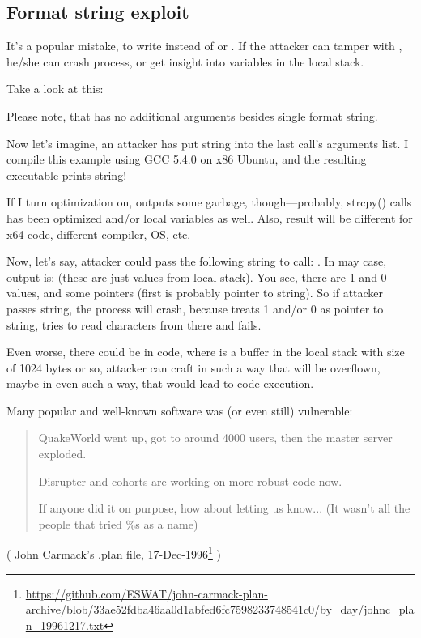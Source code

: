 \subsection{Format string exploit}

It's a popular mistake, to write  instead of  or .
If the attacker can tamper with , he/she can crash process, or get insight into variables in the local stack.

Take a look at this:



Please note, that \printf has no additional arguments besides single format string.

Now let's imagine, an attacker has put  string into the last \printf call's arguments list.
I compile this example using GCC 5.4.0 on x86 Ubuntu, and the resulting executable prints  string!

If I turn optimization on, \printf outputs some garbage, though---probably, strcpy() calls has been optimized and/or
local variables as well.
Also, result will be different for x64 code, different compiler, \ac{OS}, etc.

Now, let's say, attacker could pass the following string to \printf call: .
In may case, output is:  (these are just values from local stack).
You see, there are 1 and 0 values, and some pointers (first is probably pointer to  string).
So if attacker passes  string, the process will crash, because \printf treats 1 and/or 0
as pointer to string, tries to read characters from there and fails.

Even worse, there could be  in code, where  is a buffer in the local stack
with size of 1024 bytes or so, attacker can craft  in such a way that  will be overflown,
maybe in even such a way, that would lead to code execution.

Many popular and well-known software was (or even still) vulnerable:

\begin{framed}
\begin{quotation}
QuakeWorld went up, got to around 4000 users, then the master server exploded.

Disrupter and cohorts are working on more robust code now.

If anyone did it on purpose, how about letting us know... (It wasn't all the people that tried \%s as a name)
\end{quotation}
\end{framed}
( John Carmack's .plan file, 17-Dec-1996\footnote{\url{https://github.com/ESWAT/john-carmack-plan-archive/blob/33ae52fdba46aa0d1abfed6fc7598233748541c0/by_day/johnc_plan_19961217.txt}} )

